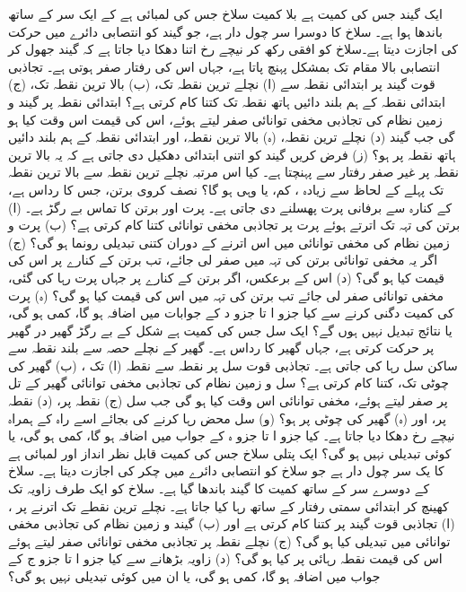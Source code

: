 ایک گیند جس کی کمیت   ہے بلا کمیت سلاخ جس کی لمبائی  ہے کے ایک سر کے ساتھ باندھا ہوا ہے۔ سلاخ کا دوسرا سر چول دار ہے، جو گیند  کو انتصابی  دائرے  میں حرکت کی اجازت دیتا ہے۔سلاخ کو افقی رکھ کر نیچے رخ اتنا  دھکا دیا جاتا ہے کہ گیند  جھول کر انتصابی بالا مقام تک بمشکل  پہنچ پاتا ہے، جہاں اس کی رفتار صفر  ہوتی ہے۔ تجاذبی قوت  گیند پر ابتدائی نقطہ سے (ا)  نچلے ترین نقطہ تک، (ب) بالا ترین نقطہ تک، (ج) ابتدائی  نقطہ کے ہم بلند  دائیں ہاتھ نقطہ تک  کتنا کام کرتی ہے؟ ابتدائی نقطہ پر گیند و زمین نظام کی تجاذبی مخفی توانائی صفر لیتے ہوئے،  اس کی قیمت  اس وقت کیا ہو گی جب گیند (د) نچلے ترین نقطہ، (ہ) بالا ترین نقطہ، اور ابتدائی نقطہ کے ہم بلند  دائیں ہاتھ نقطہ پر  ہو؟ (ز)  فرض کریں گیند کو  اتنی ابتدائی دھکیل دی جاتی ہے کہ یہ بالا ترین نقطہ پر غیر صفر رفتار سے پہنچتا ہے۔ کیا اس مرتبہ   نچلے ترین نقطہ سے بالا ترین نقطہ تک  پہلے کے لحاظ سے زیادہ ، کم، یا   وہی ہو گا؟
 نصف کروی برتن، جس کا رداس    ہے،   کے کنارہ سے      برفانی پرت پھسلنے دی جاتی ہے۔ پرت اور برتن کا  تماس بے رگڑ ہے۔  (ا)  برتن کی تہہ تک  اترتے ہوئے پرت پر تجاذبی مخفی توانائی کتنا کام کرتی ہے؟ (ب)  پرت و زمین نظام  کی مخفی توانائی میں اس  اترنے کے دوران  کتنی تبدیلی رونما ہو گی؟ (ج)  اگر یہ مخفی توانائی برتن کی تہہ  میں صفر لی جائے، تب برتن کے کنارے پر اس کی قیمت کیا ہو گی؟ (د)  اس کے برعکس، اگر برتن کے کنارے پر جہاں پرت رہا کی گئی، مخفی توانائی صفر لی جائے تب برتن کی تہہ میں اس کی قیمت کیا ہو گی؟ (ہ)  پرت کی کمیت دگنی  کرنے سے کیا  جزو ا تا جزو د  کے جوابات  میں اضافہ ہو گا، کمی ہو گی، یا  نتائج تبدیل نہیں ہوں گے؟
ایک سل جس کی کمیت  ہے شکل  کے بے رگڑ   گھیر در  گھیر پر حرکت کرتی ہے، جہاں  گھیر کا رداس  ہے۔  گھیر  کے نچلے حصہ سے  بلند   نقطہ  سے  ساکن  سل رہا کی جاتی ہے۔ تجاذبی قوت سل پر نقطہ  سے نقطہ (ا)  تک ، (ب)  گھیر کی چوٹی تک،  کتنا کام کرتی ہے؟ سل  و زمین نظام کی تجاذبی  مخفی توانائی  گھیر کے  تل  پر صفر لیتے ہوئے،  مخفی توانائی  اس وقت کیا ہو گی جب سل  (ج) نقطہ  پر، (د) نقطہ    پر،  اور (ہ)  گھیر کی چوٹی پر ہو؟ (و)  سل  محض رہا کرنے کی بجائے اسے راہ کے ہمراہ  نیچے رخ دھکا دیا جاتا ہے۔ کیا جزو ا تا جزو ہ کے جواب   میں اضافہ ہو گا، کمی ہو گی، یا  کوئی تبدیلی نہیں ہو گی؟
ایک پتلی  سلاخ  جس کی کمیت قابل نظر انداز  اور لمبائی  ہے کا یک سر چول دار ہے جو سلاخ کو انتصابی  دائرے  میں چکر کی اجازت دیتا ہے۔ سلاخ کے دوسرے سر کے ساتھ  کمیت کا گیند باندھا گیا ہے۔ سلاخ کو  ایک طرف   زاویہ تک کھینچ کر    ابتدائی سمتی رفتار کے ساتھ رہا کیا جاتا ہے۔ نچلے ترین نقطے تک اترنے پر ، (ا) تجاذبی قوت  گیند پر کتنا کام کرتی ہے اور (ب) گیند و زمین نظام کی تجاذبی مخفی توانائی میں  تبدیلی کیا ہو گی؟ (ج)  نچلے نقطہ پر تجاذبی مخفی توانائی صفر لیتے ہوئے اس کی قیمت نقطہ رہائی  پر کیا ہو گی؟ (د) زاویہ  بڑھانے سے کیا جزو ا تا جزو ج کے جواب میں اضافہ ہو گا، کمی ہو گی، یا ان میں کوئی تبدیلی نہیں ہو گی؟
